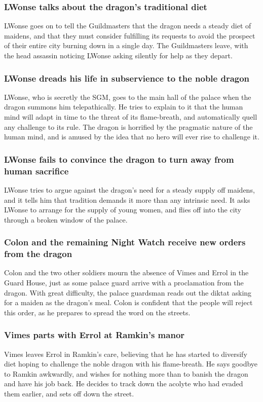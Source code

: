 \subsubsection{\Gls{LWonse} talks about the dragon's traditional diet}
\Gls{LWonse} goes on to tell the Guildmasters that the dragon needs a steady diet of maidens, and
that they must consider fulfilling its requests to avoid the prospect of their entire city burning
down in a single day. The Guildmasters leave, with the head assassin noticing \Gls{LWonse} asking
silently for help as they depart.

\subsubsection{\Gls{LWonse} dreads his life in subservience to the noble dragon}
\Gls{LWonse}, who is secretly the \Gls{SGM}, goes to the main hall of the palace when the dragon
summons him telepathically. He tries to explain to it that the human mind will adapt in time to
the threat of its flame-breath, and automatically quell any challenge to its rule. The dragon is
horrified by the pragmatic nature of the human mind, and is amused by the idea that no hero will
ever rise to challenge it.

\subsubsection{\Gls{LWonse} fails to convince the dragon to turn away from human sacrifice}
\Gls{LWonse} tries to argue against the dragon's need for a steady supply off maidens, and it
tells him that tradition demands it more than any intrinsic need. It asks \Gls{LWonse} to arrange
for the supply of young women, and flies off into the city through a broken window of the palace.

\subsubsection{\Gls{Colon} and the remaining Night Watch receive new orders from the dragon}
\Gls{Colon} and the two other soldiers mourn the absence of \Gls{Vimes} and \Gls{Errol} in the
Guard House, just as some palace guard arrive with a proclamation from the dragon. With great
difficulty, the palace guardsman reads out the diktat asking for a maiden as the dragon's meal.
\Gls{Colon} is confident that the people will reject this order, as he prepares to spread the word
on the streets.

\subsubsection{\Gls{Vimes} parts with \Gls{Errol} at \Gls{Ramkin}'s manor}
\Gls{Vimes} leaves \Gls{Errol} in \Gls{Ramkin}'s care, believing that he has started to diversify
diet hoping to challenge the noble dragon with his flame-breath. He says goodbye to \Gls{Ramkin}
awkwardly, and wishes for nothing more than to banish the dragon and have his job back. He decides
to track down the acolyte who had evaded them earlier, and sets off down the street.


